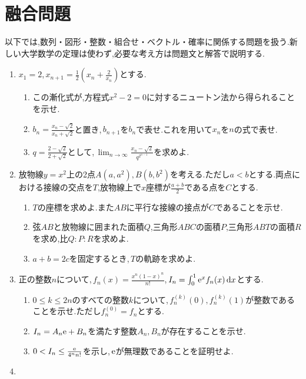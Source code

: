 \section{融合問題}\label{節:融合問題}
以下では,数列・図形・整数・組合せ・ベクトル・確率に関係する問題を扱う.新しい大学数学の定理は使わず,必要な考え方は問題文と解答で説明する.
\begin{enumerate}[label=\textbf{\thechapter.\arabic*},leftmargin=*,itemsep=6pt,start=19]
\item\label{問:融合ニュートン}
$x_1=2$,\,$x_{n+1}=\frac12\left(x_n+\frac2{x_n}\right)$とする.
\begin{enumerate}[label=(\arabic*),leftmargin=*]
\item この漸化式が,方程式$x^2-2=0$に対するニュートン法から得られることを示せ.
\item $b_n=\frac{x_n-\sqrt2}{x_n+\sqrt2}$と置き,\,$b_{n+1}$を$b_n$で表せ.これを用いて$x_n$を$n$の式で表せ.
\item $q=\frac{2-\sqrt2}{2+\sqrt2}$として,\,$\lim_{n\to\infty}\frac{x_n-\sqrt2}{q^{2^{n-1}}}$を求めよ.
\end{enumerate}
\item\label{問:融合放物線}
放物線$y=x^2$上の2点$A(a,a^2),B(b,b^2)$を考える.ただし$a<b$とする.両点における接線の交点を$T$,放物線上で$x$座標が$\frac{a+b}{2}$である点を$C$とする.
\begin{enumerate}[label=(\arabic*),leftmargin=*]
\item $T$の座標を求めよ.また$AB$に平行な接線の接点が$C$であることを示せ.
\item 弦$AB$と放物線に囲まれた面積$Q$,三角形$ABC$の面積$P$,三角形$ABT$の面積$R$を求め,比$Q:P:R$を求めよ.
\item $a+b=2c$を固定するとき,\,$T$の軌跡を求めよ.
\end{enumerate}
\item\label{問:融合自然対数の底}
正の整数$n$について,\,$f_n(x)=\frac{x^n(1-x)^n}{n!}$,\,$I_n=\int_0^1\mathrm{e}^x f_n(x)\,\mathrm{d} x$とする.
\begin{enumerate}[label=(\arabic*),leftmargin=*]
\item $0\le k\le2n$のすべての整数$k$について,\,$f_n^{(k)}(0),f_n^{(k)}(1)$が整数であることを示せ.ただし$f_n^{(0)}=f_n$とする.
\item $I_n=A_n\mathrm{e}+B_n$を満たす整数$A_n,B_n$が存在することを示せ.
\item $0<I_n\le\frac{\mathrm{e}}{4^n n!}$を示し,\,$\mathrm{e}$が無理数であることを証明せよ.
\end{enumerate}
\item\label{問:融合二項係数}

\end{enumerate}
